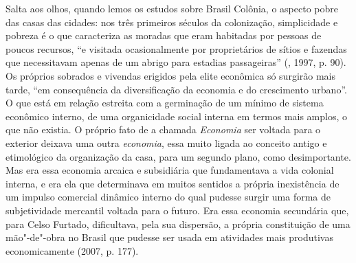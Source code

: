 Salta aos olhos, quando lemos os estudos sobre Brasil Colônia, o aspecto
pobre das casas das cidades: nos três primeiros séculos da colonização,
simplicidade e pobreza é o que caracteriza as moradas que eram habitadas
por pessoas de poucos recursos, ``e visitada ocasionalmente por
proprietários de sítios e fazendas que necessitavam apenas de um abrigo
para estadias passageiras'' (, 1997, p. 90). Os próprios
sobrados e vivendas erigidos pela elite econômica só surgirão mais
tarde, ``em consequência da diversificação da economia e do crescimento
urbano''. O que está em relação estreita com a germinação de um mínimo
de sistema econômico interno, de uma organicidade social interna em
termos mais amplos, o que não existia. O próprio fato de a chamada
\emph{Economia} ser voltada para o exterior deixava uma outra
\emph{economia}, essa muito ligada ao conceito antigo e etimológico da
organização da casa, para um segundo plano, como desimportante. Mas era
essa economia arcaica e subsidiária que fundamentava a vida colonial
interna, e era ela que determinava em muitos sentidos a própria
inexistência de um impulso comercial dinâmico interno do qual pudesse
surgir uma forma de subjetividade mercantil voltada para o futuro. Era
essa economia secundária que, para Celso Furtado, dificultava, pela sua
dispersão, a própria constituição de uma mão"-de"-obra no Brasil que
pudesse ser usada em atividades mais produtivas economicamente (2007, p.
177).

